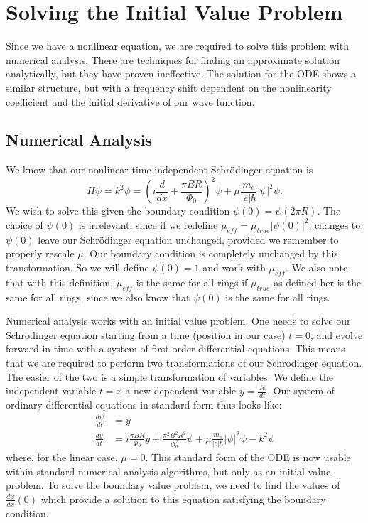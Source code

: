 \documentclass[A4,12pt,oneside]{article}
\renewcommand{\(}{\left(}
\renewcommand{\)}{\right)}
\begin{document}
\section{Solving the Initial Value Problem}

Since we have a nonlinear equation, we are required to solve this problem with numerical analysis. There are techniques for finding an approximate solution analytically, but they have proven ineffective. The solution for the ODE shows a similar structure, but with a frequency shift dependent on the nonlinearity coefficient and the initial derivative of our wave function.

\subsection{Numerical Analysis}

We know that our nonlinear time-independent Schrödinger equation is
\begin{equation}
H \psi = k^2 \psi = \left( i \frac{d}{dx} + \frac{\pi BR}{\Phi_0} \right)^2 \psi + \mu \frac{m_e}{\left|e\right|\hbar} \left|\psi\right|^2 \psi.
\end{equation}
We wish to solve this given the boundary condition $\psi\left(0\right) = \psi\left(2 \pi R\right)$. The choice of $\psi\left(0\right)$ is irrelevant, since if we redefine $\mu_{eff} = \mu_{true}\left|\psi\left(0\right)\right|^2$, changes to $\psi\left(0\right)$ leave our Schrödinger equation unchanged, provided we remember to properly rescale $\mu$. Our boundary condition is completely unchanged by this transformation. So we will define $\psi\left(0\right) = 1$ and work with $\mu_{eff}$. We also note that with this definition, $\mu_{eff}$ is the same for all rings if $\mu_{true}$ as defined her is the same for all rings, since we also know that $\psi\left(0\right)$ is the same for all rings.

Numerical analysis works with an initial value problem. One needs to solve our Schrodinger equation starting from a time (position in our case) $t=0$, and evolve forward in time with a system of first order differential equations. This means that we are required to perform two transformations of our Schrodinger equation. The easier of the two is a simple transformation of variables. We define the independent variable $t = x$ a new dependent variable $y = \frac{d\psi}{dt}$. Our system of ordinary differential equations in standard form thus looks like:
\begin{align}
\frac{d\psi}{dt} & = y\\
\frac{dy}{dt} & = i \frac{\pi BR}{\Phi_0} y + \frac{\pi^2 B^2R^2}{\Phi^2_0}  \psi + \mu \frac{m_e}{\left|e\right|\hbar} \left|\psi\right|^2 \psi -k^2 \psi
\end{align} 
where, for the linear case, $\mu = 0$. This standard form of the ODE is now usable within standard numerical analysis algorithms, but only as an initial value problem. To solve the boundary value problem, we need to find the values of $\frac{d\psi}{dx}\left(0\right)$ which provide a solution to this equation satisfying the boundary condition. 
\end{document}
